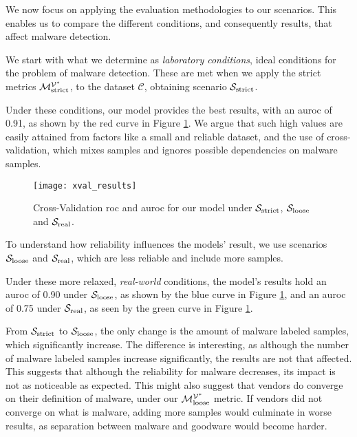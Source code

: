 We now focus on applying the evaluation methodologies to our scenarios. This enables us to compare the different conditions, and consequently results, that affect malware detection.


We start with what we determine as \textit{laboratory conditions}, ideal conditions for the problem of malware detection. These are met when we apply the strict metrics $\mathcal{M}_{\mathrm{strict}}^{\mathcal{V}^*}$, to the dataset $\mathcal{C}$, obtaining scenario $\mathcal{S}_{\mathrm{strict}}$.

Under these conditions, our model provides the best results, with an \gls{auroc} of 0.91, as shown by the red curve in Figure \ref{fig:xval_results}. We argue that such high values are easily attained from factors like a small and reliable dataset, and the use of cross-validation, which mixes samples and ignores possible dependencies on malware samples.

\begin{figure}[!h]
	\centering
	\texttt{[image: xval\_results]}
	\caption{Cross-Validation \gls{roc} and \gls{auroc} for our model under $\mathcal{S}_{\mathrm{strict}}$, $\mathcal{S}_{\mathrm{loose}}$ and $\mathcal{S}_{\mathrm{real}}$.}
	\label{fig:xval_results}
\end{figure}

To understand how reliability influences the models' result, we use scenarios $\mathcal{S}_{\mathrm{loose}}$ and $\mathcal{S}_{\mathrm{real}}$, which are less reliable and include more samples.

Under these more relaxed, \textit{real-world} conditions, the model's results hold an \gls{auroc} of 0.90 under $\mathcal{S}_{\mathrm{loose}}$, as shown by the blue curve in Figure \ref{fig:xval_results}, and an \gls{auroc} of 0.75 under $\mathcal{S}_{\mathrm{real}}$, as seen by the green curve in Figure \ref{fig:xval_results}.

From $\mathcal{S}_{\mathrm{strict}}$ to $\mathcal{S}_{\mathrm{loose}}$, the only change is the amount of malware labeled samples, which significantly increase.
The difference is interesting, as although the number of malware labeled samples increase significantly, the results are not that affected.
This suggests that although the reliability for malware decreases, its impact is not as noticeable as expected.
This might also suggest that vendors do converge on their definition of malware, under our $\mathcal{M}_{\mathrm{loose}}^{\mathcal{V}^*}$ metric.
If vendors did not converge on what is malware, adding more samples would culminate in worse results, as separation between malware and goodware would become harder.

